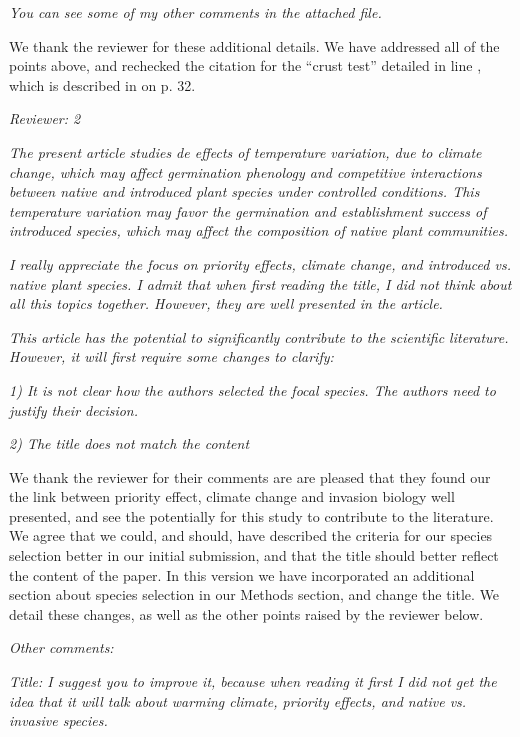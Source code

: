 \documentclass[11pt]{article}
\begin{document}
\emph{You can see some of my other comments in the attached file.}

We thank the reviewer for these additional details. We have addressed all of the points above, and rechecked the citation for the ``crust test'' detailed in line , which is described in \citet{Baskin2014} on p. 32. %

\emph{Reviewer: 2}

\emph{The present article studies de effects of temperature variation, due to climate change, which may affect germination phenology and competitive interactions between native and introduced plant species under controlled conditions. This temperature variation may favor the germination and establishment success of introduced species, which may affect the composition of native plant communities.}

\emph{I really appreciate the focus on priority effects, climate change, and introduced vs. native plant species. I admit that when first reading the title, I did not think about all this topics together. However, they are well presented in the article.}

\emph{This article has the potential to significantly contribute to the scientific literature. However, it will first require some changes to clarify:}

\emph{1) It is not clear how the authors selected the focal species. The authors need to justify their decision.}

\emph{2) The title does not match the content}

We thank the reviewer for their comments are are pleased that they found our the link between priority effect, climate change and invasion biology well presented, and see the potentially for this study to contribute to the literature. We agree that we could, and should, have described the criteria for our species selection better in our initial submission, and that the title should better reflect the content of the paper. In this version we have incorporated an additional section about species selection in our Methods section, and change the title. We detail these changes, as well as the other points raised by the reviewer below.

\emph{Other comments:}

\emph{Title: I suggest you to improve it, because when reading it first I did not get the idea that it will talk about warming climate, priority effects, and native vs. invasive species.}
\end{document}
